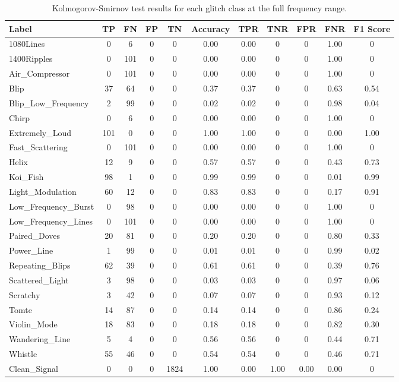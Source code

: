 \documentclass[12pt]{article}
\begin{document}
\begin{table}[H]
  \centering
  \begin{tabular}{lcccccccccc}
  \toprule
  Label & TP & FN & FP & TN & Accuracy & TPR & TNR & FPR & FNR & F1 Score \\
  \midrule
  1080Lines & 0 & 6 & 0 & 0 & 0.00 & 0.00 & 0 & 0 & 1.00 & 0 \\
  1400Ripples & 0 & 101 & 0 & 0 & 0.00 & 0.00 & 0 & 0 & 1.00 & 0 \\
  Air\_Compressor & 0 & 101 & 0 & 0 & 0.00 & 0.00 & 0 & 0 & 1.00 & 0 \\
  Blip & 37 & 64 & 0 & 0 & 0.37 & 0.37 & 0 & 0 & 0.63 & 0.54 \\
  Blip\_Low\_Frequency & 2 & 99 & 0 & 0 & 0.02 & 0.02 & 0 & 0 & 0.98 & 0.04 \\
  Chirp & 0 & 6 & 0 & 0 & 0.00 & 0.00 & 0 & 0 & 1.00 & 0 \\
  Extremely\_Loud & 101 & 0 & 0 & 0 & 1.00 & 1.00 & 0 & 0 & 0.00 & 1.00 \\
  Fast\_Scattering & 0 & 101 & 0 & 0 & 0.00 & 0.00 & 0 & 0 & 1.00 & 0 \\
  Helix & 12 & 9 & 0 & 0 & 0.57 & 0.57 & 0 & 0 & 0.43 & 0.73 \\
  Koi\_Fish & 98 & 1 & 0 & 0 & 0.99 & 0.99 & 0 & 0 & 0.01 & 0.99 \\
  Light\_Modulation & 60 & 12 & 0 & 0 & 0.83 & 0.83 & 0 & 0 & 0.17 & 0.91 \\
  Low\_Frequency\_Burst & 0 & 98 & 0 & 0 & 0.00 & 0.00 & 0 & 0 & 1.00 & 0 \\
  Low\_Frequency\_Lines & 0 & 101 & 0 & 0 & 0.00 & 0.00 & 0 & 0 & 1.00 & 0 \\
  Paired\_Doves & 20 & 81 & 0 & 0 & 0.20 & 0.20 & 0 & 0 & 0.80 & 0.33 \\
  Power\_Line & 1 & 99 & 0 & 0 & 0.01 & 0.01 & 0 & 0 & 0.99 & 0.02 \\
  Repeating\_Blips & 62 & 39 & 0 & 0 & 0.61 & 0.61 & 0 & 0 & 0.39 & 0.76 \\
  Scattered\_Light & 3 & 98 & 0 & 0 & 0.03 & 0.03 & 0 & 0 & 0.97 & 0.06 \\
  Scratchy & 3 & 42 & 0 & 0 & 0.07 & 0.07 & 0 & 0 & 0.93 & 0.12 \\
  Tomte & 14 & 87 & 0 & 0 & 0.14 & 0.14 & 0 & 0 & 0.86 & 0.24 \\
  Violin\_Mode & 18 & 83 & 0 & 0 & 0.18 & 0.18 & 0 & 0 & 0.82 & 0.30 \\
  Wandering\_Line & 5 & 4 & 0 & 0 & 0.56 & 0.56 & 0 & 0 & 0.44 & 0.71 \\
  Whistle & 55 & 46 & 0 & 0 & 0.54 & 0.54 & 0 & 0 & 0.46 & 0.71 \\
  Clean\_Signal & 0 & 0 & 0 & 1824 & 1.00 & 0.00 & 1.00 & 0.00 & 0.00 & 0 \\
  \bottomrule
  \end{tabular}
  \caption{Kolmogorov-Smirnov test results for each glitch class at the full frequency range.}
  \label{tab:ks_full_range_results}
\end{table}
\end{document}
